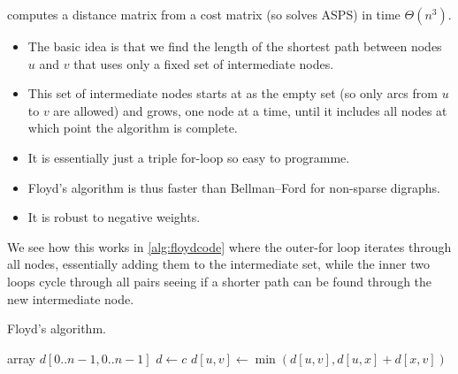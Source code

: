  computes a distance matrix from a cost matrix (so solves ASPS) in time $\Theta(n^3)$. 
\begin{itemize}
  \item The basic idea is that we find the length of the shortest path between nodes $u$ and $v$ that uses only a fixed set of intermediate nodes. 
  \item This set of intermediate nodes starts at as the empty set (so only arcs from $u$ to $v$ are allowed) and grows, one node at a time, 
until it includes all nodes at which point the algorithm is complete.
  \item It is essentially just a triple for-loop so easy to programme.
  \item Floyd's algorithm is thus faster than Bellman--Ford for non-sparse digraphs.
  \item It is robust to negative weights. 
\end{itemize}

We see how this works in \cref{alg:floydcode} where the outer-for loop iterates through all nodes, essentially adding them to the intermediate set, 
while the inner two loops cycle through all pairs seeing if a shorter path can be found through the new intermediate node.

\begin{algorithm}[H]
  \caption{Floyd's algorithm.}
  \label{alg:floydcode}
\begin{algorithmic}[1]
	\State array $d[0..n-1,0..n-1]$ 
	\State $d \gets c$ 
	 
				\State $d[u,v] \gets \min( d[u,v], d[u,x] + d[x,v] )$
				 
			\EndFor
		\EndFor
	\EndFor
	\State {}
\EndFunction
\end{algorithmic}
\end{algorithm}


